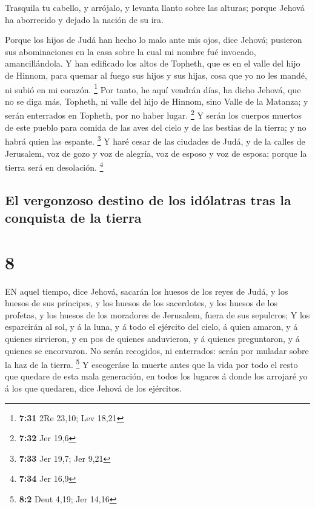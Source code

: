  Trasquila tu cabello, y arrójalo, y levanta llanto sobre
las alturas; porque Jehová ha aborrecido y dejado la nación de su ira.

 Porque los hijos de Judá han hecho lo malo ante mis ojos,
dice Jehová; pusieron sus abominaciones en la casa sobre la cual mi
nombre fué invocado, amancillándola.  Y han edificado los
altos de Topheth, que es en el valle del hijo de Hinnom, para quemar al
fuego sus hijos y sus hijas, cosa que yo no les mandé, ni subió en mi
corazón. \footnote{\textbf{7:31} 2Re 23,10; Lev 18,21}  Por
tanto, he aquí vendrán días, ha dicho Jehová, que no se diga más,
Topheth, ni valle del hijo de Hinnom, sino Valle de la Matanza; y serán
enterrados en Topheth, por no haber lugar. \footnote{\textbf{7:32} Jer
  19,6}  Y serán los cuerpos muertos de este pueblo para
comida de las aves del cielo y de las bestias de la tierra; y no habrá
quien las espante. \footnote{\textbf{7:33} Jer 19,7; Jer 9,21}
 Y haré cesar de las ciudades de Judá, y de la calles de
Jerusalem, voz de gozo y voz de alegría, voz de esposo y voz de esposa;
porque la tierra será en desolación. \footnote{\textbf{7:34} Jer 16,9}

\hypertarget{el-vergonzoso-destino-de-los-iduxf3latras-tras-la-conquista-de-la-tierra}{%
\subsection{El vergonzoso destino de los idólatras tras la conquista de
la
tierra}\label{el-vergonzoso-destino-de-los-iduxf3latras-tras-la-conquista-de-la-tierra}}

\hypertarget{section-7}{%
\section{8}\label{section-7}}

 EN aquel tiempo, dice Jehová, sacarán los huesos de los
reyes de Judá, y los huesos de sus príncipes, y los huesos de los
sacerdotes, y los huesos de los profetas, y los huesos de los moradores
de Jerusalem, fuera de sus sepulcros;  Y los esparcirán al
sol, y á la luna, y á todo el ejército del cielo, á quien amaron, y á
quienes sirvieron, y en pos de quienes anduvieron, y á quienes
preguntaron, y á quienes se encorvaron. No serán recogidos, ni
enterrados: serán por muladar sobre la haz de la tierra. \footnote{\textbf{8:2}
  Deut 4,19; Jer 14,16}  Y escogeráse la muerte antes que la
vida por todo el resto que quedare de esta mala generación, en todos los
lugares á donde los arrojaré yo á los que quedaren, dice Jehová de los
ejércitos.

